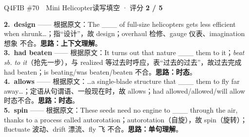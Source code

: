 \documentclass[11pt]{article}
\begin{document}
\begin{qblock}{Q4\quad FIB \#70\ \ Mini Helicopter}{读写填空 · 评分 \textcolor{cAccent}{\bfseries 2 / 5}}
\begin{notebox}
\textbf{2.\ design} —— 根据原文：The \_\_\_ of full-size helicopters gets less efficient when shrunk…；指“设计”，故 design；overhaul 检修、gauge 仪表、imagination 想象 不合。\textbf{思路：上下文理解}。\\[2pt]
\textbf{3.\ had beaten} —— 根据原文：It turns out that nature \_\_\_ them to it；\emph{beat sb. to it}（抢先一步），与 realized 等过去时呼应，表“过去的过去”，故过去完成 had beaten；is beating/was beaten/beaten 不合。\textbf{思路：时态}。\\[2pt]
\textbf{4.\ allows} —— 根据原文：…a single-blade structure that \_\_\_ them to fly far away…；定语从句谓语、一般现在时，故 allows；had allowed/allowed/will allow 时态不合。\textbf{思路：时态}。\\[2pt]
\textbf{5.\ spin} —— 根据原文：These seeds need no engine to \_\_\_ through the air, thanks to a process called autorotation；autorotation（自旋），故 spin（旋转）；fluctuate 波动、drift 漂流、fly 飞 不合。\textbf{思路：单句理解}。
\end{notebox}
\end{qblock}
\end{document}
